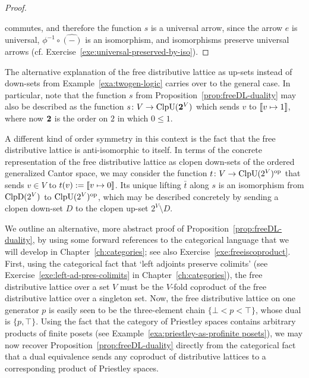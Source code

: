 \begin{proof}
\begin{center}
 \end{center}
 commutes, and therefore the function $s$ is a universal arrow, since the arrow $e$ is universal, $\phi^{-1} \circ \widehat{(-)}$ is an isomorphism, and isomorphisms preserve universal arrows (cf. Exercise~\ref{exe:universal-preserved-by-iso}).
  \end{proof}


  \begin{remark}\label{rem:free-dl-as-upsets}
    The alternative explanation of the free distributive lattice as up-sets instead of down-sets from Example~\ref{exa:twogen-logic} carries over to the general case. In particular, note that the function $s$ from Proposition~\ref{prop:freeDL-duality} may also be described as the function $s \colon V \to \mathrm{ClpU}({\bf 2}^V)$ which sends $v$ to $\llbracket {v \mapsto 1} \rrbracket$, where now ${\bf 2}$ is the order on $2$ in which $0 \leq 1$.

    A different kind of order symmetry in this context is the fact that the free distributive lattice is anti-isomorphic to itself. In terms of the concrete representation of the free distributive lattice as clopen down-sets of the ordered generalized Cantor space, we may consider the function $t \colon V \to \mathrm{ClpU}(2^V)^{\mathrm{op}}$ that sends $v \in V$ to $t(v) := \llbracket {v\mapsto 0} \rrbracket$. Its unique lifting $\bar{t}$ along $s$ is an isomorphism from $\mathrm{ClpD}(2^V)$ to $\mathrm{ClpU}(2^V)^{\mathrm{op}}$, which may be described concretely by sending a clopen down-set $D$ to the clopen up-set $2^V \setminus D$.
  \end{remark}

  \begin{remark}
    We outline an alternative, more abstract proof of Proposition~\ref{prop:freeDL-duality}, by using some forward references to the categorical language that we will develop in Chapter~\ref{ch:categories}; see also Exercise~\ref{exe:freeiscoproduct}.  First, using the categorical fact that `left adjoints preserve colimits' (see Exercise~\ref{exe:left-ad-pres-colimits} in Chapter~\ref{ch:categories}), the free distributive lattice over a set $V$ must be the $V$-fold coproduct of the free distributive lattice over a singleton set. Now, the free distributive lattice on one generator $p$ is easily seen to be the three-element chain $\{ \bot < p < \top \}$, whose dual is $\{p, \top\}$. Using the fact that the category of Priestley spaces contains arbitrary products of finite posets (see Example~\ref{exa:priestley-as-profinite posets}), we may now recover Proposition~\ref{prop:freeDL-duality} directly from the categorical fact that a dual equivalence sends any coproduct of distributive lattices to a corresponding product of Priestley spaces.
  \end{remark}
  
